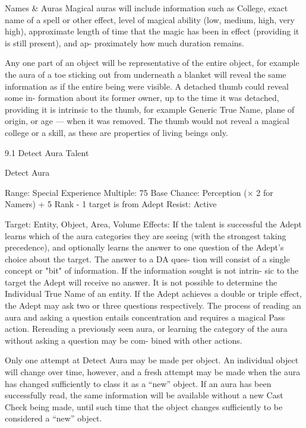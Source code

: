 \begin{Chapter}{Names \& Auras}
Magical  auras  will  include  information  such  as 
College, exact name of a spell or other effect, level 
of magical ability (low, medium, high, very high), 
approximate length of time that the magic has been 
in  effect  (providing  it  is  still  present),  and  ap-
proximately how much duration remains. 

Any one part of an object will be representative of 
the  entire  object,  for  example  the  aura  of  a  toe 
sticking  out  from underneath  a  blanket  will  reveal 
the  same  information  as  if  the  entire  being  were 
visible.  A  detached  thumb  could  reveal  some  in-
formation about its former owner, up to the time it 
was detached, providing it is intrinsic to the thumb, 
for  example  Generic  True  Name,  plane  of  origin, 
or age — when it was removed. The thumb would 
not reveal a magical college or a skill, as these are 
properties of living beings only. 

9.1 Detect Aura Talent 

Detect Aura 

Range: Special 
Experience Multiple: 75 
Base Chance: Perception (× 2 for Namers) + 5%
Rank - 1%
target is from Adept 
Resist: Active 

Target: Entity, Object, Area, Volume 
Effects:  If the talent is successful the Adept learns 
which  of  the  aura  categories  they  are  seeing  (with 
the  strongest  taking  precedence),  and  optionally 
learns  the  answer  to  one  question  of  the  Adept’s 
choice about the target. The answer to a DA ques-
tion  will  consist  of  a  single  concept  or  "bit"  of 
information. If the information sought is not intrin-
sic to  the  target  the  Adept  will  receive  no  answer. 
It  is  not  possible  to  determine  the  Individual  True 
Name  of  an  entity.  If  the  Adept  achieves  a double 
or  triple  effect,  the  Adept  may  ask  two  or  three 
questions  respectively.  The  process  of  reading  an 
aura  and  asking  a  question  entails  concentration 
and  requires  a  magical  Pass  action.  Rereading  a 
previously  seen  aura,  or  learning  the  category  of 
the  aura  without  asking  a  question  may  be  com-
bined with other actions. 

Only one attempt at Detect Aura may be made per 
object. An individual object will change over time, 
however,  and  a  fresh  attempt  may  be  made  when 
the  aura  has  changed  sufficiently  to  class  it  as  a 
“new” object. If an aura has been successfully read, 
the  same  information  will  be  available  without  a 
new  Cast  Check  being  made,  until  such  time  that 
the  object  changes  sufficiently  to  be  considered  a 
“new” object. 


\end{Chapter}
